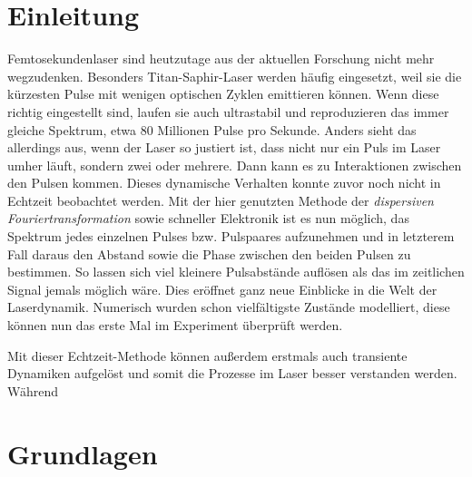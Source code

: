 \documentclass[bachelor,       %
               twoside,        %
               BCOR10mm,       %
               english,ngerman, %
               ]{GAUBM}
\begin{document}
\mainmatter   %

\chapter{Einleitung}
Femtosekundenlaser sind heutzutage aus der aktuellen Forschung nicht mehr wegzudenken.
Besonders Titan-Saphir-Laser werden häufig eingesetzt, weil sie die kürzesten Pulse mit wenigen optischen Zyklen emittieren können.
Wenn diese richtig eingestellt sind, laufen sie auch ultrastabil und reproduzieren das immer gleiche Spektrum, etwa 80 Millionen Pulse pro Sekunde.
Anders sieht das allerdings aus, wenn der Laser so justiert ist, dass nicht nur ein Puls im Laser umher läuft, sondern zwei oder mehrere.
Dann kann es zu Interaktionen zwischen den Pulsen kommen.
Dieses dynamische Verhalten konnte zuvor noch nicht in Echtzeit beobachtet werden.
Mit der hier genutzten Methode der \textit{dispersiven Fouriertransformation} sowie schneller Elektronik ist es nun möglich, das Spektrum jedes einzelnen Pulses bzw. Pulspaares aufzunehmen und in letzterem Fall daraus den Abstand sowie die Phase zwischen den beiden Pulsen zu bestimmen.
So lassen sich viel kleinere Pulsabstände auflösen als das im zeitlichen Signal jemals möglich wäre.
Dies eröffnet ganz neue Einblicke in die Welt der Laserdynamik.
Numerisch wurden schon vielfältigste Zustände modelliert, diese können nun das erste Mal im Experiment überprüft werden.

Mit dieser Echtzeit-Methode können außerdem erstmals auch transiente Dynamiken aufgelöst und somit die Prozesse im Laser besser verstanden werden.
Während \cite{herink_resolving_2016}

\chapter{Grundlagen}
\end{document}
